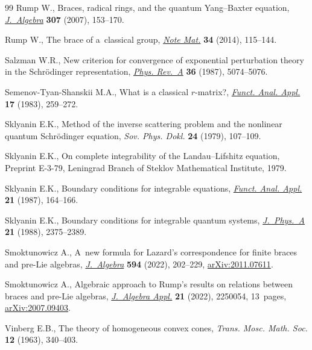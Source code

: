 \documentclass[pdftex]{sigma}
\numberwithin{equation}{section}
\theoremstyle{definition}
\begin{document}
\begin{thebibliography}{99}
Rump W., Braces, radical rings, and the quantum {Y}ang--{B}axter equation,
 \href{https://doi.org/10.1016/j.jalgebra.2006.03.040}{\textit{J.~Algebra}}
 \textbf{307} (2007), 153--170.

Rump W., The brace of a~classical group,
 \href{https://doi.org/10.1285/i15900932v34n1p115}{\textit{Note Mat.}}
 \textbf{34} (2014), 115--144.

Salzman W.R., New criterion for convergence of exponential perturbation theory
 in the {S}chr\"odinger representation,
 \href{https://doi.org/10.1103/PhysRevA.36.5074}{\textit{Phys. Rev.~A}}
 \textbf{36} (1987), 5074--5076.

Semenov-Tyan-Shanskii M.A., What is a classical $r$-matrix?,
 \href{https://doi.org/10.1007/BF01076717}{\textit{Funct. Anal. Appl.}}
 \textbf{17} (1983), 259--272.


Sklyanin E.K., Method of the inverse scattering problem and the nonlinear
 quantum {S}chr\"odinger equation, \textit{Sov. Phys. Dokl.} \textbf{24}
 (1979), 107--109.

Sklyanin E.K., On complete integrability of the {L}andau--{L}ifshitz equation,
 {P}reprint E-3-79, Leningrad Branch of Steklov Mathematical Institute, 1979.

Sklyanin E.K., Boundary conditions for integrable equations,
 \href{https://doi.org/10.1007/BF01078038}{\textit{Funct. Anal. Appl.}}
 \textbf{21} (1987), 164--166.

Sklyanin E.K., Boundary conditions for integrable quantum systems,
 \href{https://doi.org/10.1088/0305-4470/21/10/015}{\textit{J.~Phys.~A}}
 \textbf{21} (1988), 2375--2389.

Smoktunowicz A., A~new formula for {L}azard's correspondence for finite braces
 and pre-{L}ie algebras,
 \href{https://doi.org/10.1016/j.jalgebra.2021.11.027}{\textit{J.~Algebra}}
 \textbf{594} (2022), 202--229,
 \href{http://arxiv.org/abs/2011.07611}{arXiv:2011.07611}.

Smoktunowicz A., Algebraic approach to {R}ump's results on relations between
 braces and pre-{L}ie algebras,
 \href{https://doi.org/10.1142/S0219498822500542}{\textit{J.~Algebra Appl.}}
 \textbf{21} (2022), 2250054, 13~pages,
 \href{http://arxiv.org/abs/2007.09403}{arXiv:2007.09403}.

Vinberg E.B., The theory of homogeneous convex cones, \textit{Trans. Mosc.
 Math. Soc.} \textbf{12} (1963), 340--403.


\end{thebibliography}
\end{document}
